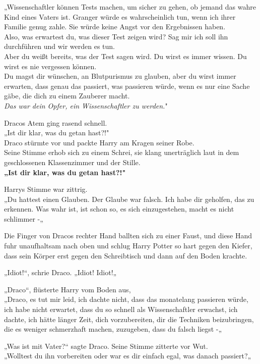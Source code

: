 {„Wissenschaftler können Tests machen, um sicher zu gehen, ob jemand das wahre Kind eines Vaters ist. Granger würde es wahrscheinlich tun, wenn ich ihrer Familie genug zahle. Sie würde keine Angst vor den Ergebnissen haben.\\ Also, was erwartest du, was dieser Test zeigen wird? Sag mir ich soll ihn durchführen und wir werden es tun.\\ Aber du weißt bereits, was der Test sagen wird. Du wirst es immer wissen. Du wirst es nie vergessen können.\\ Du magst dir wünschen, an Blutpurismus zu glauben, aber du wirst immer erwarten, dass genau das passiert, was passieren würde, wenn es nur eine Sache gäbe, die dich zu einem Zauberer macht.\\ \emph{Das war dein Opfer, ein Wissenschaftler zu werden.}"

Dracos Atem ging rasend schnell.\\ „Ist dir klar, was du getan hast?!"\\ Draco stürmte vor und packte Harry am Kragen seiner Robe.\\ Seine Stimme erhob sich zu einem Schrei, sie klang unerträglich laut in dem geschlossenen Klassenzimmer und der Stille.\\ \textbf{„Ist dir klar, was du getan hast?!"}

Harrys Stimme war zittrig.\\ „Du hattest einen Glauben. Der Glaube war falsch. Ich habe dir geholfen, das zu erkennen. Was wahr ist, ist schon so, es sich einzugestehen, macht es nicht schlimmer -„

Die Finger von Dracos rechter Hand ballten sich zu einer Faust, und diese Hand fuhr unaufhaltsam nach oben und schlug Harry Potter so hart gegen den Kiefer, dass sein Körper erst gegen den Schreibtisch und dann auf den Boden krachte.

„Idiot!“, schrie Draco. „Idiot! Idiot!„

„Draco“, flüsterte Harry vom Boden aus,\\ „Draco, es tut mir leid, ich dachte nicht, dass das monatelang passieren würde, ich habe nicht erwartet, dass du so schnell als Wissenschaftler erwachst, ich dachte, ich hätte länger Zeit, dich vorzubereiten, dir die Techniken beizubringen, die es weniger schmerzhaft machen, zuzugeben, dass du falsch liegst -„

„Was ist mit Vater?“ sagte Draco. Seine Stimme zitterte vor Wut.\\ „Wolltest du ihn vorbereiten oder war es dir einfach egal, was danach passiert?„

}
